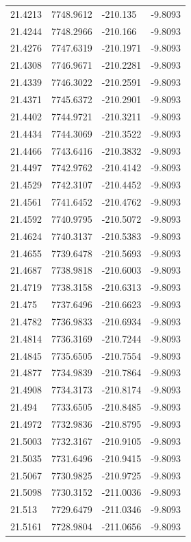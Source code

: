 \begin{table}[H]
\begin{tabular}{llll}
21.4213 & 7748.9612 & -210.135 & -9.8093 \\
21.4244 & 7748.2966 & -210.166 & -9.8093 \\
21.4276 & 7747.6319 & -210.1971 & -9.8093 \\
21.4308 & 7746.9671 & -210.2281 & -9.8093 \\
21.4339 & 7746.3022 & -210.2591 & -9.8093 \\
21.4371 & 7745.6372 & -210.2901 & -9.8093 \\
21.4402 & 7744.9721 & -210.3211 & -9.8093 \\
21.4434 & 7744.3069 & -210.3522 & -9.8093 \\
21.4466 & 7743.6416 & -210.3832 & -9.8093 \\
21.4497 & 7742.9762 & -210.4142 & -9.8093 \\
21.4529 & 7742.3107 & -210.4452 & -9.8093 \\
21.4561 & 7741.6452 & -210.4762 & -9.8093 \\
21.4592 & 7740.9795 & -210.5072 & -9.8093 \\
21.4624 & 7740.3137 & -210.5383 & -9.8093 \\
21.4655 & 7739.6478 & -210.5693 & -9.8093 \\
21.4687 & 7738.9818 & -210.6003 & -9.8093 \\
21.4719 & 7738.3158 & -210.6313 & -9.8093 \\
21.475 & 7737.6496 & -210.6623 & -9.8093 \\
21.4782 & 7736.9833 & -210.6934 & -9.8093 \\
21.4814 & 7736.3169 & -210.7244 & -9.8093 \\
21.4845 & 7735.6505 & -210.7554 & -9.8093 \\
21.4877 & 7734.9839 & -210.7864 & -9.8093 \\
21.4908 & 7734.3173 & -210.8174 & -9.8093 \\
21.494 & 7733.6505 & -210.8485 & -9.8093 \\
21.4972 & 7732.9836 & -210.8795 & -9.8093 \\
21.5003 & 7732.3167 & -210.9105 & -9.8093 \\
21.5035 & 7731.6496 & -210.9415 & -9.8093 \\
21.5067 & 7730.9825 & -210.9725 & -9.8093 \\
21.5098 & 7730.3152 & -211.0036 & -9.8093 \\
21.513 & 7729.6479 & -211.0346 & -9.8093 \\
21.5161 & 7728.9804 & -211.0656 & -9.8093 \\

\end{tabular}
\end{table}
